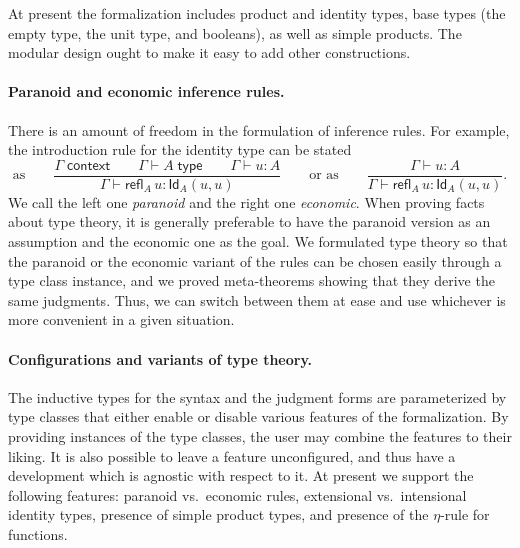 \documentclass{easychair}
\newcommand{\Id}[3]{\mathsf{Id}_{#1}(#2,#3)}
\newcommand{\refl}[2]{\mathsf{refl}_{#1}\,#2}
\newcommand{\ctx}{\Gamma}
\newcommand{\isctx}{\ctx\;\mathsf{context}}
\newcommand{\istype}[1]{\ctx \vdash #1 \;\mathsf{type}}
\newcommand{\isterm}[2]{\ctx \vdash #1 : #2}
\begin{document}
At present the formalization includes product and identity types, base types (the empty
type, the unit type, and booleans), as well as simple products. The modular design ought
to make it easy to add other constructions.


\paragraph*{Paranoid and economic inference rules.}


There is an amount of freedom in the formulation of inference rules. For example, the
introduction rule for the identity type can be stated
%
\begin{equation*}
  \text{as}\qquad
  \frac{\isctx \qquad
  \istype{A} \qquad
  \isterm{u}{A}
  }{\isterm{\refl{A}{u}}{\Id{A}{u}{u}}}
  \qquad\text{or as}\qquad
  \frac{\isterm{u}{A}
  }{\isterm{\refl{A}{u}}{\Id{A}{u}{u}}}.
\end{equation*}
%
We call the left one \emph{paranoid} and the right one \emph{economic}. When proving facts about type theory, it is generally
preferable to have the paranoid version as an assumption and the economic one as the goal.
We formulated type theory so that the paranoid or the economic variant of the rules can be
chosen easily through a type class instance, and we proved meta-theorems showing that they
derive the same judgments. Thus, we can switch between them at ease and use whichever is
more convenient in a given situation.

\paragraph*{Configurations and variants of type theory.}
\label{sec:config-variant}


The inductive types for the syntax and the judgment forms are parameterized by type classes
that either enable or disable various features of the formalization. By providing
instances of the type classes, the user may combine the features to their liking. It is
also possible to leave a feature unconfigured, and thus have a development which is
agnostic with respect to it. At present we support the following features: paranoid
vs.~economic rules, extensional vs.~intensional identity types, presence of simple product
types, and presence of the $\eta$-rule for functions.
\end{document}
